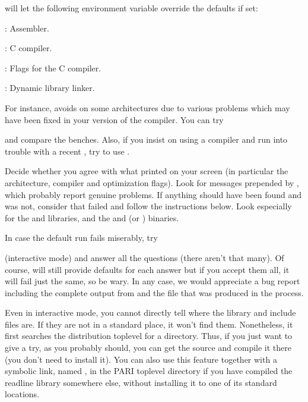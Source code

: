 
\noindent {} will let the following environment variable
override the defaults if set:

: Assembler.

: C compiler.

: Flags for the C compiler.

: Dynamic library linker.

\noindent For instance,  avoids  on some
architectures due to various problems which may have been fixed in your
version of the compiler. You can try


\noindent and compare the benches. Also, if you insist on using a 
compiler and run into trouble with a recent , try to use
.

 Decide whether you agree with what
 printed on your screen (in particular the architecture,
compiler and optimization flags). Look for messages prepended by
\kbd{\#\#\#}, which probably report genuine problems. If anything should have
been found and was not, consider that  failed and follow the
instructions below. Look especially for the  and 
libraries, and the  and  (or ) binaries.

In case the default  run fails miserably, try


\noindent (interactive mode) and answer all the questions (there aren't that
many). Of course,  will still provide defaults for each answer
but if you accept them all, it will fail just the same, so be wary. In any
case, we would appreciate a bug report including the complete output from
 and the file  that was produced in
the process.

Even in interactive mode, you cannot directly tell 
where the  library and include files are. If they are not in a
standard place, it won't find them. Nonetheless, it first searches the
distribution toplevel for a  directory. Thus, if you just want
to give  a try, as you probably should, you can get the source
and compile it there (you don't need to install it). You can also use this
feature together with a symbolic link, named , in the PARI
toplevel directory if you have compiled the readline library somewhere else,
without installing it to one of its standard locations. 

